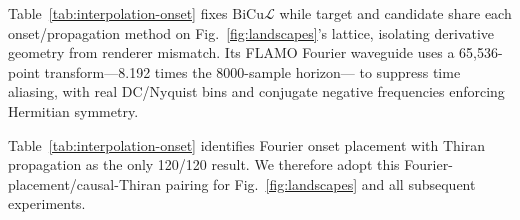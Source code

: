 \documentclass[conference]{IEEEtran}
\newcommand{\PaperRoot}{paper}%
\newcommand{\PaperRoot}{.}%
\newcommand{\bicul}{\ensuremath{\mathrm{BiCu}\mathcal{L}}}
\begin{document}
Table~\ref{tab:interpolation-onset} fixes \bicul{} while target and candidate
share each onset/propagation method on Fig.~\ref{fig:landscapes}'s lattice,
isolating derivative geometry from renderer mismatch. Its FLAMO Fourier
waveguide uses a 65,536-point transform---8.192 times the 8000-sample horizon---
to suppress time aliasing, with real DC/Nyquist bins and conjugate negative
frequencies enforcing Hermitian symmetry.

\begin{table}[!t]
\centering
\caption{\normalfont Target-directed \bicul{} descent directions (\%) by onset
placement (rows) and propagation interpolation (columns); higher is better.}
\label{tab:interpolation-onset}
\resizebox{\columnwidth}{!}{%
}
\end{table}

\begin{table}[!t]
\centering
\caption{\normalfont Median Hungarian-matched pitch and onset errors over 150
phrases per event count; lower is better.}
\label{tab:pilot-compact}

\end{table}

Table~\ref{tab:interpolation-onset} identifies Fourier onset placement with
Thiran propagation as the only 120/120 result. We therefore adopt this
Fourier-placement/causal-Thiran pairing for Fig.~\ref{fig:landscapes} and all
subsequent experiments.
\end{document}
